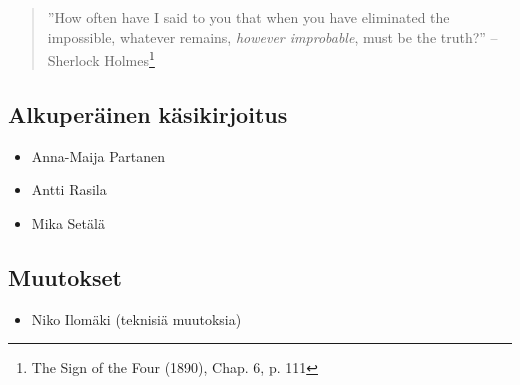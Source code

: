 \begin{quote}
''How often have I said to you that when you have eliminated the impossible, whatever remains, \emph{however improbable}, must be the truth?'' -- Sherlock Holmes\footnote{The Sign of the Four (1890), Chap. 6, p. 111}
\end{quote}

\subsection*{Alkuperäinen käsikirjoitus}
\begin{itemize}
\item Anna-Maija Partanen
\item Antti Rasila
\item Mika Setälä
\end{itemize}

\subsection*{Muutokset}
\begin{itemize}
\item Niko Ilomäki (teknisiä muutoksia)
\end{itemize}
